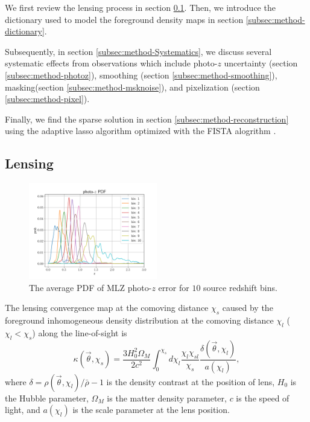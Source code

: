 \documentclass[twocolumn]{aastex62}
\begin{document}
We first review the lensing process in section \ref{subsec:method-delta2shear}.
Then, we introduce the dictionary used to model the foreground density maps in section \ref{subsec:method-dictionary}.

Subsequently, in section \ref{subsec:method-Systematics}, we discuss several systematic effects from observations which 
include photo-$z$ uncertainty (section \ref{subsec:method-photoz}),
smoothing (section \ref{subsec:method-smoothing}),
masking(section \ref{subsec:method-msknoise}),
and pixelization (section \ref{subsec:method-pixel}).

Finally, we find the sparse solution in section \ref{subsec:method-reconstruction} using the adaptive lasso algorithm 
\citep{AdaLASSO-Zou2006} optimized with the FISTA alogrithm \citep{FISTA-Beck2009}.


\subsection{Lensing}
\label{subsec:method-delta2shear}

\begin{figure}[!t]
 \centering
 \includegraphics[width=0.5\textwidth]{mlz-poz.pdf}
 \caption{The average PDF of MLZ photo-$z$ error for $10$ source redshift bins.}\label{fig-pdfpz}
\end{figure}

The lensing convergence map at the comoving distance $\chi_s$ caused by the foreground inhomogeneous
density distribution at the comoving distance $\chi_l$ ($\chi_l< \chi_s$) along the line-of-sight is
\begin{equation}
\kappa(\vec{\theta},\chi_s)=\frac{3H_0^2\Omega_M}{2 c^2} \int_0^{\chi_s} d\chi_l \frac{\chi_l \chi_{sl}}{\chi_s}
\frac{\delta(\vec{\theta},\chi_l)}{a(\chi_l)},
\end{equation}
where $\delta=\rho(\vec{\theta},\chi_l)/\bar{\rho}-1$ is the density contrast
at the position of lens, $H_0$ is the Hubble parameter, $\Omega_M$ is the matter density parameter, $c$ is the speed
of light, and $a(\chi_l)$ is the scale parameter at the lens position.
\end{document}
